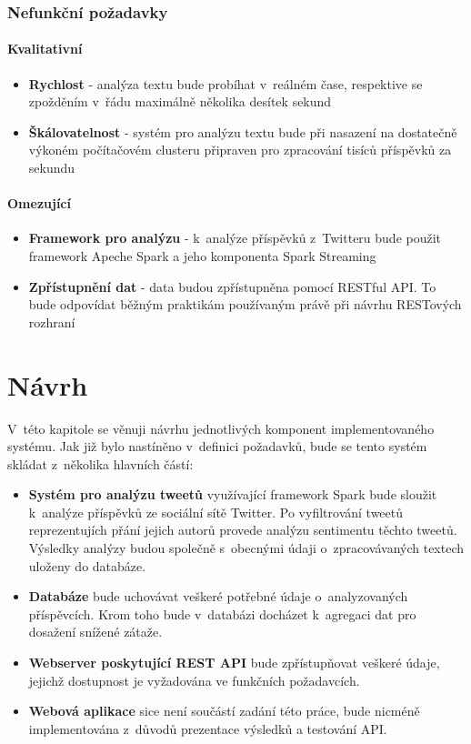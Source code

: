 \documentclass[thesis=B,czech]{FITthesis}[2012/06/26]
\begin{document}
\subsection{Nefunkční požadavky}
\subsubsection{Kvalitativní}
\begin{itemize}
\item \textbf{Rychlost} - analýza textu bude probíhat v~reálném čase, respektive se zpožděním v~řádu maximálně několika desítek sekund
\item \textbf{Škálovatelnost} - systém pro analýzu textu bude při nasazení na dostatečně výkoném počítačovém clusteru připraven pro zpracování tisíců příspěvků za sekundu
\end{itemize}
\subsubsection{Omezující}
\begin{itemize}
\item \textbf{Framework pro analýzu} - k~analýze příspěvků z~Twitteru bude použit framework Apeche Spark a jeho komponenta Spark Streaming
\item \textbf{Zpřístupnění dat} - data budou zpřístupněna pomocí RESTful API. To bude odpovídat běžným praktikám používaným právě při návrhu RESTových rozhraní
\end{itemize}


\chapter{Návrh}
\label{navrh}
V~této kapitole se věnuji návrhu jednotlivých komponent implementovaného systému. Jak již bylo nastíněno v~definici požadavků, bude se tento systém skládat z~několika hlavních částí: 
\begin{itemize}
\item \textbf{Systém pro analýzu tweetů} využívající framework Spark bude sloužit k~analýze příspěvků ze sociální sítě Twitter. Po vyfiltrování tweetů reprezentujích přání jejich autorů provede analýzu sentimentu těchto tweetů. Výsledky analýzy budou společně s~obecnými údaji o~zpracovávaných textech uloženy do databáze. 
\item \textbf{Databáze} bude uchovávat veškeré potřebné údaje o~analyzovaných příspěvcích. Krom toho bude v~databázi docházet k~agregaci dat pro dosažení snížené zátaže. 
\item \textbf{Webserver poskytující REST API} bude zpřístupňovat veškeré údaje, jejichž dostupnost je vyžadována ve funkčních požadavcích. 
\item \textbf{Webová aplikace} sice není součástí zadání této práce, bude nicméně implementována z~důvodů prezentace výsledků a testování API. 
\end{itemize}
\end{document}
